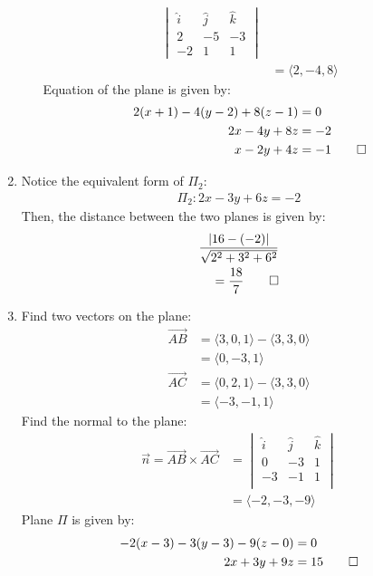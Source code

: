 \documentclass[12pt, a4paper]{article}
\begin{document}
\begin{enumerate}[Q\arabic*.]
\begin{enumerate}[(\alph*)]
\begin{align*}
\begin{vmatrix}
                    \hat{i} & \hat{j} & \hat{k}\\
                    2 & -5 & -3\\
                    -2 & 1 & 1
                  \end{vmatrix}\\
                  &= \langle 2,-4,8 \rangle
        \end{align*}
        Equation of the plane is given by:
        \begin{align*}
          2(x+1)-4(y-2)+8(z-1) &= 0\\
          2x-4y+8z&=-2\\
          x-2y+4z&=-1 \qed
        \end{align*}
    \end{enumerate}
  
  \item Notice the equivalent form of $\Pi_2$:
    \begin{align*}
      \Pi_2: 2x-3y+6z=-2
    \end{align*}
    Then, the distance between the two planes is given by:
    \begin{align*}
      \frac{|16-(-2)|}{\sqrt{2^2 + 3^2 + 6^2}}\\
      = \frac{18}{7} \qed
    \end{align*}
    \pagebreak

  \item
      Find two vectors on the plane:
      \begin{align*}
        \vec{AB} &= \langle 3,0,1\rangle - \langle 3,3,0\rangle\\
                 &= \langle 0,-3,1\rangle\\
        \vec{AC} &= \langle 0,2,1\rangle - \langle 3,3,0\rangle\\
                 &= \langle -3,-1,1\rangle
      \end{align*}
      Find the normal to the plane:
      \begin{align*}
        \vec{n} = \vec{AB} \times \vec{AC}
                &= \begin{vmatrix}
                  \hat{i} & \hat{j} & \hat{k}\\
                  0 & -3 & 1\\
                  -3 & -1&1\\
                \end{vmatrix}\\
                &= \langle -2, -3, -9\rangle
      \end{align*}
      Plane $\Pi$ is given by:
      \begin{align*}
        -2(x-3) -3(y-3) -9(z-0) &= 0\\
        2x +3y + 9z &= 15 \qed
      \end{align*}


\end{enumerate}
\end{document}
